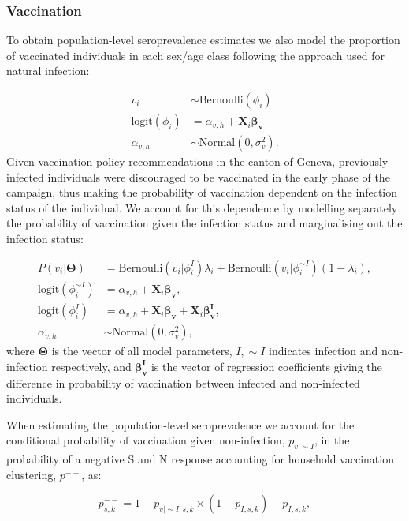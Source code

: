 \documentclass{article}
\begin{document}
\hypertarget{vaccination}{%
\subsubsection*{Vaccination}\label{vaccination}}

To obtain population-level seroprevalence estimates we also model the
proportion of vaccinated individuals in each sex/age class following the
approach used for natural infection:

\[
\begin{aligned}
  v_{i} &\sim \text{Bernoulli}(\phi_i) \\
  \text{logit}(\phi_i) &= \alpha_{v,h} + \mathbf{X}_i \boldsymbol{\beta_v} \\
  \alpha_{v,h} &\sim \text{Normal}(0, \sigma_v^2).
\end{aligned}
\] Given vaccination policy recommendations in the canton of Geneva,
previously infected individuals were discouraged to be vaccinated in the
early phase of the campaign, thus making the probability of vaccination
dependent on the infection status of the individual. We account for this
dependence by modelling separately the probability of vaccination given
the infection status and marginalising out the infection status:

\[
\begin{aligned}
  P(v_{i}|\mathbf{\Theta})  &= \text{Bernoulli}(v_i|\phi_i^I)\lambda_i + \text{Bernoulli}(v_i|\phi_i^{\sim I})(1-\lambda_i),\\
  \text{logit}(\phi_i^{\sim I}) &= \alpha_{v,h} + \mathbf{X}_i \boldsymbol{\beta_v}, \\
  \text{logit}(\phi_i^I) &= \alpha_{v,h} + \mathbf{X}_i \boldsymbol{\beta_v} + \mathbf{X}_i \boldsymbol{\beta_v^I}, \\
  \alpha_{v,h} &\sim \text{Normal}(0, \sigma_v^2),
\end{aligned}
\] where $\boldsymbol{\Theta}$ is the vector of all model parameters,
$I, {\sim} I$ indicates infection and non-infection respectively, and
$\boldsymbol{\beta_v^I}$ is the vector of regression coefficients
giving the difference in probability of vaccination between infected and
non-infected individuals.

When estimating the population-level seroprevalence we account for the conditional probability of vaccination given non-infection, $p_{v|\sim I}$, in the probability of a negative S and N response accounting for household vaccination clustering, $p^{--}$, as:

$$
p_{s,k}^{--} = 1 - p_{v|\sim I, s, k} \times \left(1- p_{I, s,k}\right) - p_{I, s,k},
$$
\end{document}
